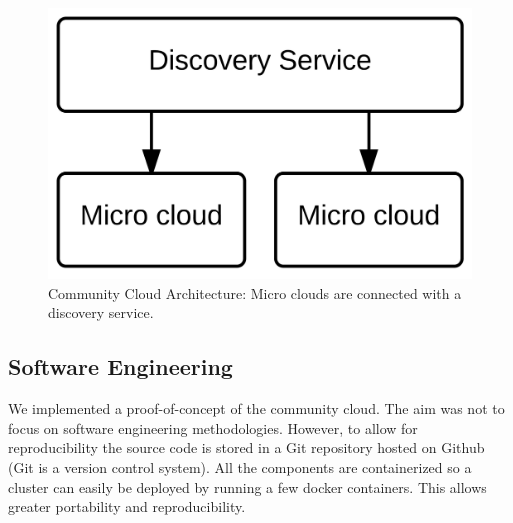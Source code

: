 \documentclass{sig-alternate-05-2015}
\begin{document}
\begin{figure}
\centering
\includegraphics[scale=0.3]{img/communitycloud}
\caption{Community Cloud Architecture: Micro clouds are connected with a discovery service.}
\label{fig:discovery}
\end{figure}


\subsection{Software Engineering}

We implemented a proof-of-concept of the community cloud. The aim was not to focus on software engineering methodologies. However, to allow for reproducibility the source code is stored in a Git repository hosted on Github (Git is a version control system). All the components are containerized so a cluster can easily be deployed by running a few docker containers. This allows greater portability and reproducibility. 
\end{document}
